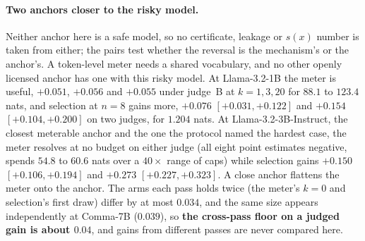 \paragraph{Two anchors closer to the risky model.}\label{app:frontier3}
Neither anchor here is a safe model, so no certificate, leakage or $s(x)$ number is taken from either; the pairs test whether the reversal is the mechanism's or the anchor's. A token-level meter needs a shared vocabulary, and no other openly licensed anchor has one with this risky model. At Llama-3.2-1B the meter is useful,
$+0.051$, $+0.056$ and $+0.055$ under judge~B at $k=1,3,20$ for $88.1$ to $123.4$ nats, and selection at
$n=8$ gains more, $+0.076$ $[+0.031, +0.122]$ and $+0.154$ $[+0.104, +0.200]$ on two judges, for $1.204$
nats. At Llama-3.2-3B-Instruct, the closest meterable anchor and the one the protocol named the hardest
case, the meter resolves at no budget on either judge (all eight point estimates negative, spends $54.8$ to
$60.6$ nats over a $40\times$ range of caps) while selection gains $+0.150$ $[+0.106, +0.194]$ and $+0.273$
$[+0.227, +0.323]$. A close anchor flattens the meter onto the anchor. The arms each pass holds twice (the
meter's $k=0$ and selection's first draw) differ by at most $0.034$, and the same size appears independently
at Comma-7B ($0.039$), so \textbf{the cross-pass floor on a judged gain is about $0.04$}, and gains from
different passes are never compared here.
